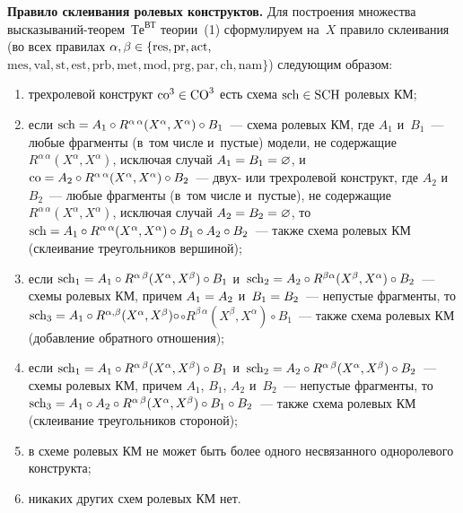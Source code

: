 \begin{multicols}{2}
\smallskip
  
 \noindent
  \textbf{Правило склеивания ролевых конструктов.} Для по\-строения множества  
вы\-ска\-зы\-ва\-ний-тео\-рем~$\mathrm{Те}^{\mathrm{ВТ}}$ теории~(1) 
сформулируем на~$X$ правило 
склеивания (во всех правилах $\alpha,\beta\hm\in \{\mathrm{res}, 
\mathrm{pr}, \mathrm{act},$ $\mathrm{mes}, \mathrm{val}, \mathrm{st}, 
\mathrm{est}, \mathrm{prb}, \mathrm{met}, \mathrm{mod},
\mathrm{prg},\mathrm{par}, %
\mathrm{ch},  \mathrm{nam}\}$) следующим образом: 
\begin{enumerate}[(1)]
\item трехролевой конструкт $\mathrm{co}^3\hm\in \mathrm{CO}^3$ есть схема 
$\mathrm{sch}\hm\in \mathrm{SCH}$ ролевых КМ; 
\item если $\mathrm{sch}\hm= A_1\circ 
R^{\alpha\,\alpha}(X^\alpha,X^\alpha)\circ B_1$~--- схема ролевых КМ, где $A_1$ и~$B_1$~--- 
любые фрагменты (в~том числе и~пустые) модели, не содержащие 
$R^{\alpha\,\alpha}(X^\alpha, X^\alpha)$, исключая случай $A_1\hm= B_1\hm= \varnothing$, 
и~$\mathrm{co}\hm= A_2\circ R^{\alpha\,\alpha} (X^\alpha,X^\alpha)\circ B_2$~--- двух- или 
трехролевой конструкт, где $A_2$ и~$B_2$~--- любые фрагменты (в~том числе и~пустые), не 
содержащие $R^{\alpha\,\alpha}(X^\alpha,X^\alpha)$, исключая случай $A_2\hm= B_2\hm= 
\varnothing$, то $\mathrm{sch}\hm= A_1\circ R^{\alpha\,\alpha}(X^\alpha, X^\alpha)\circ B_1
\circ A_2\circ B_2$~--- также схема ролевых КМ (склеивание треугольников вершиной); 
\item если 
$\mathrm{sch}_1\hm= A_1\circ R^{\alpha\,\beta}(X^\alpha, X^\beta)\circ B_1$ 
и~$\mathrm{sch}_2\hm= A_2\circ  R^{\beta\alpha}(X^\beta, X^\alpha)\circ B_2$~--- схемы ролевых КМ, причем 
$A_1\hm= A_2$ и~$B_1\hm=B_2$~--- не\-пус\-тые фрагменты, то $\mathrm{sch}_3\hm= A_1\circ R^{\alpha,\beta}(X^\alpha,
 X^\beta)\circ$\linebreak $\circ 
R^{\beta\,\alpha} (X^\beta, X^\alpha)\circ B_1$~--- также схема ролевых КМ (добавление 
обратного отношения); 
\item если $\mathrm{sch}_1\hm= A_1\circ R^{\alpha\,\beta} (X^\alpha, X^\beta)\circ 
B_1$ и~$\mathrm{sch}_2\hm= A_2\circ R^{\alpha\,\beta} (X^\alpha, X^\beta)\circ B_2$~--- схемы ролевых 
КМ, причем $A_1$, $B_1$, $A_2$ и~$B_2$~--- непустые фрагменты, то $\mathrm{sch}_3\hm= A_1\circ 
A_2\circ R^{\alpha\,\beta}(X^\alpha, X^\beta)\circ B_1 \circ B_2$~--- также схема 
ролевых КМ 
(склеивание треугольников стороной); 
\item в схеме ролевых КМ не может быть более одного 
несвязанного одноролевого конструкта; 
\item никаких других схем ролевых КМ нет.
\end{enumerate}
  

\end{multicols}
